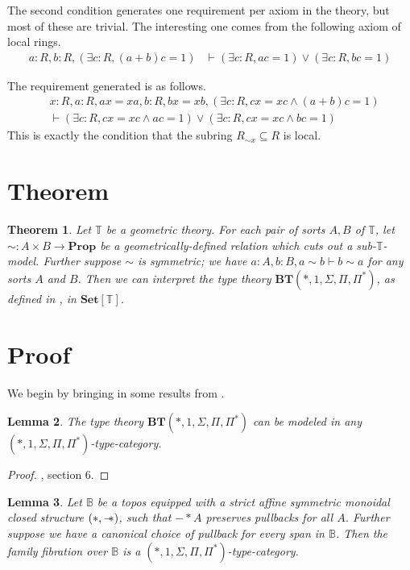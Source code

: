 \documentclass{article}
\newtheorem{theorem}{Theorem}[section]
\newtheorem{lemma}[theorem]{Lemma}
\newcommand*{\Set}{\mathbf{Set}}
\newcommand*{\T}{\mathbb{T}}
\newcommand*{\B}{\mathbb{B}}
\newcommand*{\wand}{\mathbin{-\mkern-6mu*}}
\begin{document}
The second condition generates one requirement per axiom in the theory, but most of these are trivial.
The interesting one comes from the following axiom of local rings.
\begin{align*}
    a : R, b : R, (\exists c : R, (a+b)c = 1) &\vdash (\exists c : R, ac = 1) \lor (\exists c : R, bc = 1)
\end{align*}

The requirement generated is as follows.
\begin{align*}
    &x : R, a : R, ax = xa, b : R, bx = xb, (\exists c : R, cx = xc \land (a+b)c = 1)
    \\ &\vdash (\exists c : R, cx = xc \land ac = 1) \lor (\exists c : R, cx = xc \land bc = 1)
\end{align*}
This is exactly the condition that the subring \(R_{\sim x} \subseteq R\) is local.

\section{Theorem}

\begin{theorem} \label{main}
    Let \(\T\) be a geometric theory.
    For each pair of sorts \(A,B\) of \(\T\), let \(\sim : A \times B \to \mathbf{Prop}\) be a geometrically-defined relation which cuts out a sub-\(\T\)-model.
    Further suppose \(\sim\) is symmetric; we have \(a : A, b : B, a \sim b \vdash b \sim a\) for any sorts \(A\) and \(B\).
    Then we can interpret the type theory \(\mathbf{BT}(*, 1, \Sigma, \Pi, \Pi^*)\), as defined in \cite[Section 5.1]{schopp}, in \(\Set[\T]\).
\end{theorem}

\section{Proof}

We begin by bringing in some results from \cite{schopp}.

\begin{lemma}
    The type theory \(\mathbf{BT}(*, 1, \Sigma, \Pi, \Pi^*)\) can be modeled in any \\
    \((*, 1, \Sigma, \Pi, \Pi^*)\)-type-category.
\end{lemma}

\begin{proof}
    \cite{schopp}, section 6.
\end{proof}

\begin{lemma}
    Let \(\B\) be a topos equipped with a strict affine symmetric monoidal closed structure \((*,\wand)\),
    such that \(- * A\) preserves pullbacks for all \(A\).
    Further suppose we have a canonical choice of pullback for every span in \(\B\).
    Then the family fibration over \(\B\) is a \((*, 1, \Sigma, \Pi, \Pi^*)\)-type-category.
\end{lemma}
\end{document}
